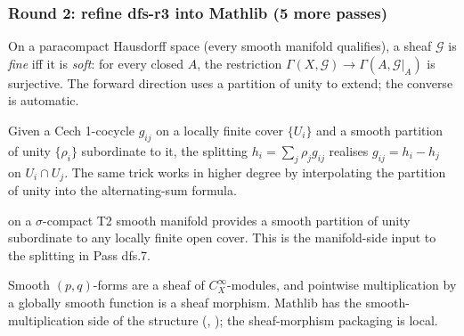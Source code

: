 \subsubsection*{Round 2: refine dfs-r3 into Mathlib (5 more passes)}

\begin{lemma}[Pass dfs.6: ``fine'' = soft on a paracompact Hausdorff space]
\label{lem:dfs-r6}
On a paracompact Hausdorff space (every smooth manifold qualifies), a sheaf $\mathcal{G}$ is \emph{fine} iff it is \emph{soft}: for every closed $A$, the restriction $\Gamma(X, \mathcal{G}) \to \Gamma(A, \mathcal{G}|_{A})$ is surjective.  The forward direction uses a partition of unity to extend; the converse is automatic.
\leanok
\end{lemma}

\begin{lemma}[Pass dfs.7: a soft sheaf has $\check{H}^{q\geq 1} = 0$]
\label{lem:dfs-r7}
Given a Cech 1-cocycle $g_{ij}$ on a locally finite cover $\{U_{i}\}$ and a smooth partition of unity $\{\rho_{i}\}$ subordinate to it, the splitting $h_{i} = \sum_{j} \rho_{j} g_{ij}$ realises $g_{ij} = h_{i} - h_{j}$ on $U_{i} \cap U_{j}$.  The same trick works in higher degree by interpolating the partition of unity into the alternating-sum formula.
\leanok
\end{lemma}

\begin{lemma}
\label{lem:dfs-r8}
 on a $\sigma$-compact T2 smooth manifold provides a smooth partition of unity subordinate to any locally finite open cover.  This is the manifold-side input to the splitting in Pass dfs.7.
\leanok\mathlibok
\end{lemma}

\begin{lemma}
\label{lem:dfs-r9}
Smooth $(p,q)$-forms are a sheaf of $C^{\infty}_{X}$-modules, and pointwise multiplication by a globally smooth function is a sheaf morphism.  Mathlib has the smooth-multiplication side of the structure (, ); the sheaf-morphism packaging is local.
\leanok\mathlibok
\end{lemma}

